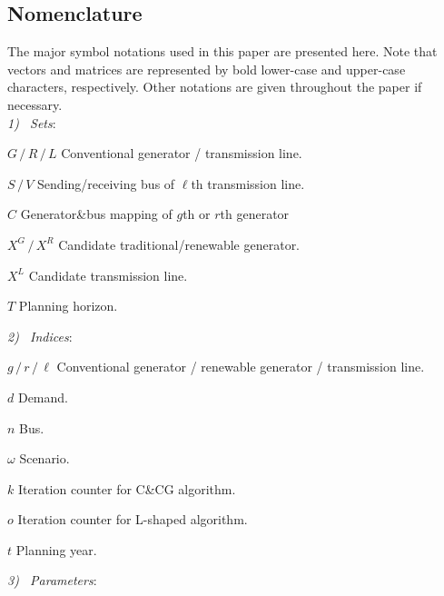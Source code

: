 \documentclass[journal]{IEEEtran}
\begin{document}
\subsection{Nomenclature}
The major symbol notations used in this paper are presented here. Note that vectors and matrices are represented by bold lower-case and upper-case characters, respectively. Other notations are given throughout the paper if necessary.\\
\noindent \emph{1) \ Sets}:
\begin{IEEEdescription}
\item[$G \, / \, R \, / \, L$] Conventional generator / transmission line.
\item[$S \, / \, V$] Sending/receiving bus of $\ell$th transmission line.
\item[$C$] Generator\&bus mapping of $g$th or $r$th generator
\item[$X^G \, / \, X^R$] Candidate traditional/renewable generator.
\item[$X^L$] Candidate transmission line.
\item[$T$] Planning horizon.
\end{IEEEdescription}
\emph{2) \ Indices}:
\begin{IEEEdescription}
\item[$g \, / \, r \, / \, \ell$] Conventional generator / renewable generator / transmission line.
\item[$d$] Demand.
\item[$n$] Bus.
\item[$\omega$] Scenario.
\item[$k$] Iteration counter for C\&CG algorithm.
\item[$o$] Iteration counter for L-shaped algorithm.
\item[$t$] Planning year.
\end{IEEEdescription}
\emph{3) \ Parameters}:
\end{document}
